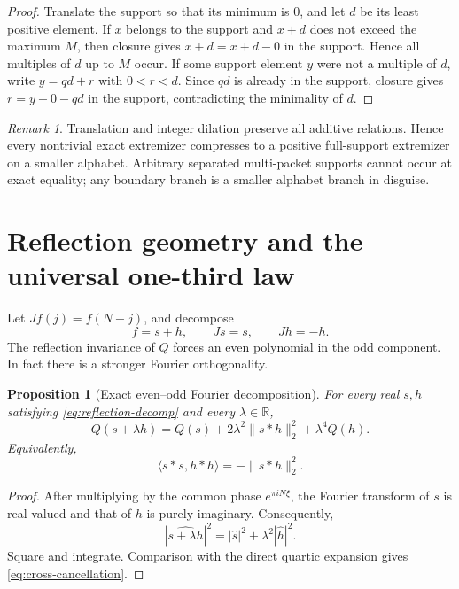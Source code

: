 \documentclass[11pt,reqno]{amsart}
\numberwithin{equation}{section}
\newtheorem{proposition}[proposition]{Proposition}
\theoremstyle{definition}
\theoremstyle{remark}
\newtheorem{remark}[remark]{Remark}
\newcommand{\R}{\mathbb R}
\newcommand{\norm}[1]{\lVert #1\rVert}
\newcommand{\ip}[2]{\langle #1,#2\rangle}
\begin{document}
\begin{proof}
Translate the support so that its minimum is $0$, and let $d$ be its least
positive element.  If $x$ belongs to the support and $x+d$ does not exceed
the maximum $M$, then closure gives $x+d=x+d-0$ in the support.  Hence all
multiples of $d$ up to $M$ occur.  If some support element $y$ were not a
multiple of $d$, write $y=qd+r$ with $0<r<d$.  Since $qd$ is already in the
support, closure gives $r=y+0-qd$ in the support, contradicting the
minimality of $d$.
\end{proof}

\begin{remark}
Translation and integer dilation preserve all additive relations.  Hence
every nontrivial exact extremizer compresses to a positive full-support
extremizer on a smaller alphabet.  Arbitrary separated multi-packet
supports cannot occur at exact equality; any boundary branch is a smaller
alphabet branch in disguise.
\end{remark}

\section{Reflection geometry and the universal one-third law}

Let $Jf(j)=f(N-j)$, and decompose
\begin{equation}\label{eq:reflection-decomp}
  f=s+h,
  \qquad Js=s,
  \qquad Jh=-h.
\end{equation}
The reflection invariance of $Q$ forces an even polynomial in the odd
component.  In fact there is a stronger Fourier orthogonality.

\begin{proposition}[Exact even--odd Fourier decomposition]\label{prop:exact-reflection}
For every real $s,h$ satisfying \eqref{eq:reflection-decomp} and every
$\lambda\in\R$,
\begin{equation}\label{eq:exact-reflection}
  \boxed{
  Q(s+\lambda h)
  =Q(s)+2\lambda^2\norm{s*h}_2^2+\lambda^4Q(h).}
\end{equation}
Equivalently,
\begin{equation}\label{eq:cross-cancellation}
  \ip{s*s}{h*h}=-\norm{s*h}_2^2.
\end{equation}
\end{proposition}

\begin{proof}
After multiplying by the common phase $e^{\pi iN\xi}$, the Fourier
transform of $s$ is real-valued and that of $h$ is purely imaginary.
Consequently,
\[
  |\widehat{s+\lambda h}|^2
  =|\widehat s|^2+\lambda^2|\widehat h|^2.
\]
Square and integrate.  Comparison with the direct quartic expansion gives
\eqref{eq:cross-cancellation}.
\end{proof}
\end{document}
